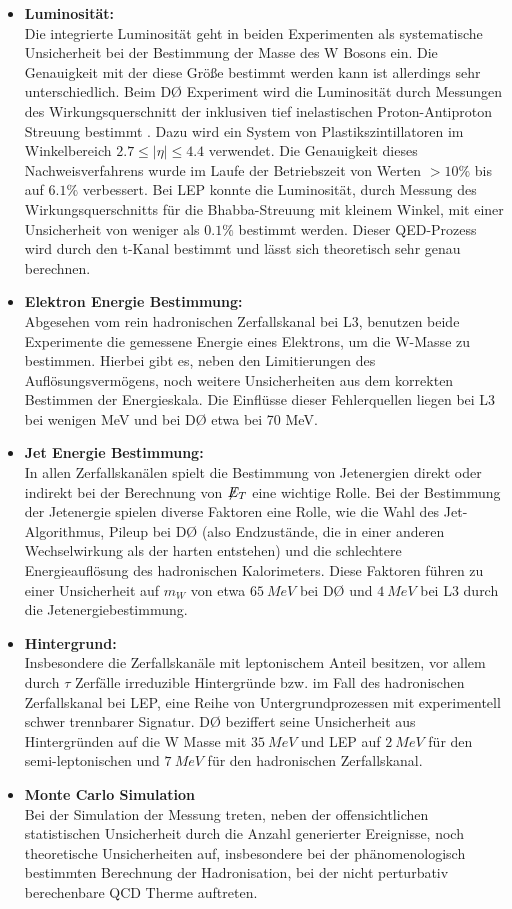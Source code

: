 \documentclass[a4paper,12pt]{article}
\newcommand{\met}{\ensuremath{\not\mathrel{E}}_T}
\begin{document}
\begin{itemize}
	\item \textbf{Luminosität:} \\
	Die integrierte Luminosität geht in beiden Experimenten als systematische Unsicherheit bei der Bestimmung der Masse des W Bosons ein.
	Die Genauigkeit mit der diese Größe bestimmt werden kann ist allerdings sehr unterschiedlich. Beim DØ Experiment wird die Luminosität
	durch Messungen des Wirkungsquerschnitt der inklusiven tief inelastischen Proton-Antiproton Streuung bestimmt \cite{2011arXiv1106.5182P}. Dazu
	wird ein System von Plastikszintillatoren im Winkelbereich $2.7 \leq |\eta| \leq 4.4$ verwendet. Die Genauigkeit dieses Nachweisverfahrens wurde
	im Laufe der Betriebszeit von Werten $ > 10\%$ bis auf $ 6.1\%$ verbessert. Bei LEP konnte die Luminosität, durch Messung des 
	Wirkungsquerschnitts für die Bhabba-Streuung mit kleinem Winkel, mit einer Unsicherheit von weniger	als $0.1\%$ bestimmt werden. Dieser QED-Prozess
	wird durch den t-Kanal bestimmt und lässt sich theoretisch sehr genau berechnen.
	\item \textbf{Elektron Energie Bestimmung:} \\
	Abgesehen vom rein hadronischen Zerfallskanal bei L3, benutzen beide Experimente die gemessene Energie eines Elektrons, um die W-Masse zu bestimmen.
	Hierbei gibt es, neben den Limitierungen des Auflösungsvermögens, noch weitere Unsicherheiten aus dem korrekten Bestimmen der Energieskala.
	Die Einflüsse dieser Fehlerquellen liegen bei L3 bei wenigen MeV und bei DØ etwa bei 70 MeV.
	\item \textbf{Jet Energie Bestimmung:} \\
	In allen Zerfallskanälen spielt die Bestimmung von Jetenergien direkt oder indirekt bei der Berechnung von $\met$ eine wichtige Rolle. Bei der
	Bestimmung der Jetenergie spielen diverse Faktoren eine Rolle, wie die Wahl des Jet-Algorithmus, Pileup bei DØ (also Endzustände, die in einer anderen Wechselwirkung
	als der harten entstehen) und die schlechtere Energieauflösung des hadronischen Kalorimeters. Diese Faktoren führen zu einer Unsicherheit auf $m_{W}$ von
	etwa $\SI{65}{MeV}$ bei DØ und $\SI{4}{MeV}$ bei L3 durch die Jetenergiebestimmung.
	\item \textbf{Hintergrund:}\\
	Insbesondere die Zerfallskanäle mit leptonischem Anteil besitzen, vor allem durch $\tau$ Zerfälle irreduzible Hintergründe bzw. im Fall
	des hadronischen Zerfallskanal bei LEP, eine Reihe von Untergrundprozessen mit experimentell schwer trennbarer Signatur. DØ beziffert seine
	Unsicherheit aus Hintergründen auf die W Masse mit $\SI{35}{MeV}$ und LEP auf $\SI{2}{MeV}$ für den semi-leptonischen und $\SI{7}{MeV}$
	für den hadronischen Zerfallskanal.
	\item \textbf{Monte Carlo Simulation}\\
	Bei der Simulation der Messung treten, neben der offensichtlichen statistischen Unsicherheit durch die Anzahl generierter Ereignisse, noch
	theoretische Unsicherheiten auf, insbesondere bei der phänomenologisch bestimmten Berechnung der Hadronisation, bei der nicht perturbativ berechenbare
	QCD Therme auftreten.
\end{itemize}
\end{document}
